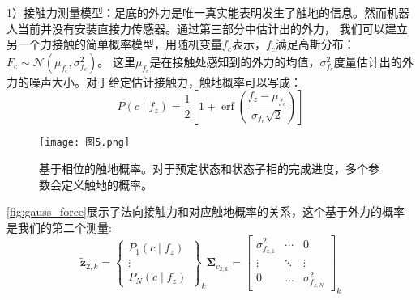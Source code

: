 1）接触力测量模型：足底的外力是唯一真实能表明发生了触地的信息。然而机器人当前并没有安装直接力传感器。通过第三部分中估计出的外力，
我们可以建立另一个力接触的简单概率模型，用随机变量$f_c$表示，$f_c$满足高斯分布：$F_c \sim \mathcal{N}\left(\mu_{f_c}, \sigma_{f_c}^2\right)$。
这里$\mu_{f_c}$是在接触处感知到的外力的均值，$\sigma_{f_c}^2$度量估计出的外力的噪声大小。对于给定估计接触力，触地概率可以写成：
\begin{equation}
    \label{equ:est_force_prob}
    P\left(c \mid f_z\right)=\frac{1}{2}\left[1+\operatorname{erf}\left(\frac{f_z-\mu_{f_c}}{\sigma_{f_c} \sqrt{2}}\right)\right]
\end{equation}
\begin{figure}[htbp]
    \centering
    \texttt{[image: 图5.png]}
    \caption{\label{fig:gauss_force}基于相位的触地概率。对于预定状态和状态子相的完成进度，多个参数会定义触地的概率。}
\end{figure}
\autoref{fig:gauss_force}展示了法向接触力和对应触地概率的关系，这个基于外力的概率是我们的第二个测量:
\begin{equation}
    \label{equ:est_force_noise}
    \tilde{\boldsymbol{z}}_{2, k}=\left\{\begin{array}{c}
        P_1\left(c \mid f_z\right) \\
        \vdots \\
        P_N\left(c \mid f_z\right)
        \end{array}\right\}_k \boldsymbol{\Sigma}_{v_{2, k}}=\left[\begin{array}{ccc}
        \sigma_{f_{z, 1}}^2 & \cdots & 0 \\
        \vdots & \ddots & \vdots \\
        0 & \ldots & \sigma_{f_{z, N}}^2
        \end{array}\right]_k
\end{equation}

